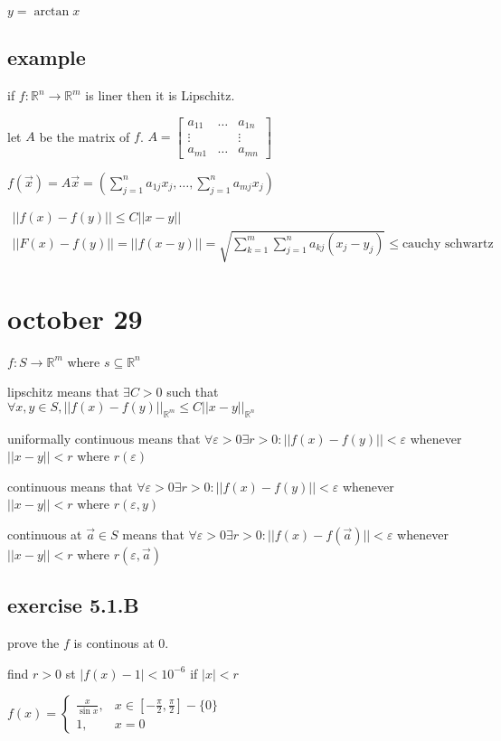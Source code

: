 \documentclass[letterpaper]{article}
\begin{document}
$y=\arctan x$

\subsection*{example}
if $f:\mathbb{R}^n\to\mathbb{R}^m$ is liner then it is Lipschitz.

let $A$ be the matrix of $f$. 
$A=\left[\begin{array}{ccc}a_{11}&\hdots&a_{1n}\\\vdots&&\vdots\\a_{m1}&\hdots&a_{mn}\end{array}\right]$

$f(\vec{x})=A\vec{x}=\left(\sum\limits_{j=1}^n{a_{1j}x_j},\dots,\sum\limits_{j=1}^n{a_{mj}x_j}\right)$

\begin{align*}
  ||f(x)-f(y)||\le C||x-y||\\
  ||F(x)-f(y)||=||f(x-y)||=\sqrt{\sum\limits_{k=1}^m{\sum\limits_{j=1}^n{a_{kj}(x_j-y_j)}}}\le\text{cauchy schwartz}
\end{align*}

\section*{october 29}
$f:S\to \mathbb{R}^m$ where $s\subseteq \mathbb{R}^n$

lipschitz means that $\exists C>0$ such  that $\forall x,y\in S,||f(x)-f(y)||_{\mathbb{R}^m}\le C||x-y||_{\mathbb{R}^n}$

uniformally continuous means that $\forall \varepsilon>0\exists r>0:||f(x)-f(y)||<\varepsilon$ whenever $||x-y||<r$ where $r(\varepsilon)$

continuous means that $\forall \varepsilon>0\exists r>0:||f(x)-f(y)||<\varepsilon$ whenever $||x-y||<r$ where $r(\varepsilon,y)$

continuous at $\vec{a}\in S$ means that $\forall \varepsilon>0\exists r>0:||f(x)-f(\vec{a})||<\varepsilon$ whenever $||x-y||<r$ where $r(\varepsilon,\vec{a})$

\subsection*{exercise 5.1.B}
prove the $f$ is continous at $0$.

find $r>0$ st $|f(x)-1|<10^{-6}$ if $|x|<r$

$f(x)=\begin{cases}\frac{x}{\sin x},&x\in[-\frac{\pi}{2},\frac{\pi}{2}]-\{0\}\\1,&x=0\end{cases}$
\end{document}
